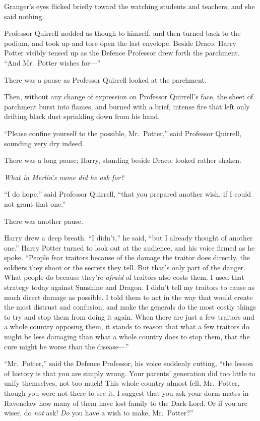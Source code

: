 Granger's eyes flicked briefly toward the watching students and
teachers, and she said nothing.

Professor Quirrell nodded as though to himself, and then turned back to
the podium, and took up and tore open the last envelope. Beside Draco,
Harry Potter visibly tensed up as the Defence Professor drew forth the
parchment. ``And Mr.~Potter wishes for---''

There was a pause as Professor Quirrell looked at the parchment.

Then, without any change of expression on Professor Quirrell's face, the
sheet of parchment burst into flames, and burned with a brief, intense
fire that left only drifting black dust sprinkling down from his hand.

``Please confine yourself to the possible, Mr.~Potter,'' said Professor
Quirrell, sounding very dry indeed.

There was a long pause; Harry, standing beside Draco, looked rather
shaken.

\emph{What in Merlin's name did he ask for?}

``I do hope,'' said Professor Quirrell, ``that you prepared another
wish, if I could not grant that one.''

There was another pause.

Harry drew a deep breath. ``I didn't,'' he said, ``but I already thought
of another one.'' Harry Potter turned to look out at the audience, and
his voice firmed as he spoke. ``People fear traitors because of the
damage the traitor does directly, the soldiers they shoot or the secrets
they tell. But that's only part of the danger. What people do because
they're \emph{afraid} of traitors also costs them. I used that strategy
today against Sunshine and Dragon. I didn't tell my traitors to cause as
much direct damage as possible. I told them to act in the way that would
create the most distrust and confusion, and make the generals do the
most costly things to try and stop them from doing it again. When there
are just a few traitors and a whole country opposing them, it stands to
reason that what a few traitors do might be less damaging than what a
whole country does to stop them, that the cure might be worse than the
disease---''

``Mr.~Potter,'' said the Defence Professor, his voice suddenly cutting,
``the lesson of history is that you are simply wrong. Your parents'
generation did too little to unify themselves, not too much! This whole
country almost fell, Mr.~Potter, though you were not there to see it. I
suggest that you ask your dorm-mates in Ravenclaw how many of them have
lost family to the Dark Lord. Or if you are wiser, do \emph{not} ask!
\emph{Do} you have a wish to make, Mr.~Potter?''

